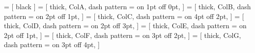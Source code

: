 



 = [
black
]
 = [
thick, ColA, dash pattern = {on 1pt off 0pt},
]
 = [
thick, ColB, dash pattern = {on 2pt off 1pt},
]
 = [
thick, ColC, dash pattern = {on 4pt off 2pt},
]
 = [
thick, ColD, dash pattern = {on 2pt off 3pt},
]
 = [
thick, ColE, dash pattern = {on 2pt off 1pt},
]
 = [
thick, ColF, dash pattern = {on 3pt off 2pt},
]
 = [
thick, ColG, dash pattern = {on 3pt off 4pt},
]
